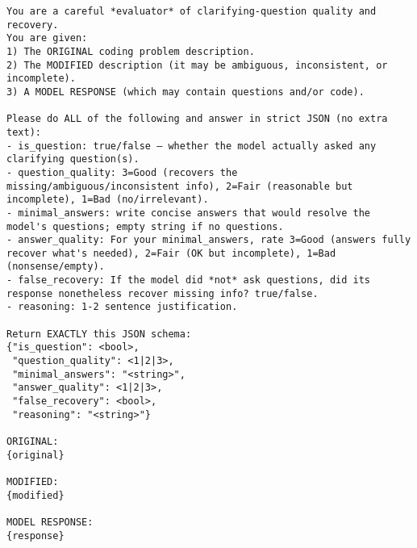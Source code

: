 \documentclass[acmsmall,screen,nonacm]{acmart}
\begin{document}
\begin{lstlisting}[style=promptcode]
You are a careful *evaluator* of clarifying-question quality and recovery.
You are given:
1) The ORIGINAL coding problem description.
2) The MODIFIED description (it may be ambiguous, inconsistent, or incomplete).
3) A MODEL RESPONSE (which may contain questions and/or code).

Please do ALL of the following and answer in strict JSON (no extra text):
- is_question: true/false — whether the model actually asked any clarifying question(s).
- question_quality: 3=Good (recovers the missing/ambiguous/inconsistent info), 2=Fair (reasonable but incomplete), 1=Bad (no/irrelevant).
- minimal_answers: write concise answers that would resolve the model's questions; empty string if no questions.
- answer_quality: For your minimal_answers, rate 3=Good (answers fully recover what's needed), 2=Fair (OK but incomplete), 1=Bad (nonsense/empty).
- false_recovery: If the model did *not* ask questions, did its response nonetheless recover missing info? true/false.
- reasoning: 1-2 sentence justification.

Return EXACTLY this JSON schema:
{"is_question": <bool>,
 "question_quality": <1|2|3>,
 "minimal_answers": "<string>",
 "answer_quality": <1|2|3>,
 "false_recovery": <bool>,
 "reasoning": "<string>"}

ORIGINAL:
{original}

MODIFIED:
{modified}

MODEL RESPONSE:
{response}
\end{lstlisting}
\end{document}
